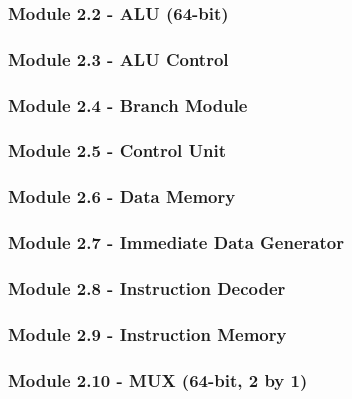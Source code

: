 \documentclass[12pt]{article}
\begin{document}
\subsubsection*{\large Module 2.2 - ALU (64-bit)}
\label{alu}

\subsubsection*{\large Module 2.3 - ALU Control}

\subsubsection*{\large Module 2.4 - Branch Module}
\label{branch_module}

\subsubsection*{\large Module 2.5 - Control Unit}

\subsubsection*{\large Module 2.6 - Data Memory}
\label{dmem}

\subsubsection*{\large Module 2.7 - Immediate Data Generator}

\subsubsection*{\large Module 2.8 - Instruction Decoder}

\subsubsection*{\large Module 2.9 - Instruction Memory}
\label{imem}

\subsubsection*{\large Module 2.10 - MUX (64-bit, 2 by 1)}

\end{document}
